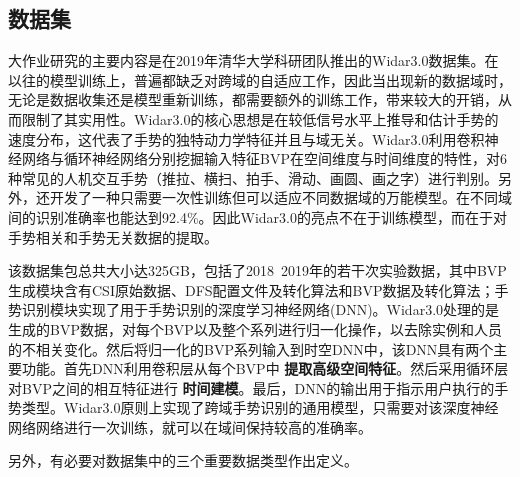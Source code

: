 \documentclass[a4paper]{article}
\begin{document}
  \subsection{数据集}
  大作业研究的主要内容是在2019年清华大学科研团队推出的Widar3.0数据集。在以往的模型训练上，普遍都缺乏对跨域的自适应工作，因此当出现新的数据域时，无论是数据收集还是模型重新训练，都需要额外的训练工作，带来较大的开销，从而限制了其实用性。Widar3.0的核心思想是在较低信号水平上推导和估计手势的速度分布，这代表了手势的独特动力学特征并且与域无关。Widar3.0利用卷积神经网络与循环神经网络分别挖掘输入特征BVP在空间维度与时间维度的特性，对6种常见的人机交互手势（推拉、横扫、拍手、滑动、画圆、画之字）进行判别。另外，还开发了一种只需要一次性训练但可以适应不同数据域的万能模型。在不同域间的识别准确率也能达到92.4\%。因此Widar3.0的亮点不在于训练模型，而在于对手势相关和手势无关数据的提取。\par
  该数据集包总共大小达325GB，包括了2018~2019年的若干次实验数据，其中BVP生成模块含有CSI原始数据、DFS配置文件及转化算法和BVP数据及转化算法；手势识别模块实现了用于手势识别的深度学习神经网络(DNN)。Widar3.0处理的是生成的BVP数据，对每个BVP以及整个系列进行归一化操作，以去除实例和人员的不相关变化。然后将归一化的BVP系列输入到时空DNN中，该DNN具有两个主要功能。首先DNN利用卷积层从每个BVP中 \textbf{提取高级空间特征}。然后采用循环层对BVP之间的相互特征进行 \textbf{时间建模}。最后，DNN的输出用于指示用户执行的手势类型。Widar3.0原则上实现了跨域手势识别的通用模型，只需要对该深度神经网络网络进行一次训练，就可以在域间保持较高的准确率。\par
  另外，有必要对数据集中的三个重要数据类型作出定义。 \par
\end{document}
